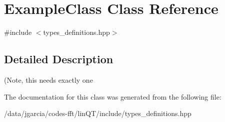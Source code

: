 \hypertarget{classExampleClass}{}\section{Example\+Class Class Reference}
\label{classExampleClass}


{\ttfamily \#include $<$types\+\_\+definitions.\+hpp$>$}



\subsection{Detailed Description}
(Note, this needs exactly one 

The documentation for this class was generated from the following file\+:\begin{DoxyCompactItemize}
\item 
/data/jgarcia/codes-\/fft/lin\+Q\+T/include/types\+\_\+definitions.\+hpp\end{DoxyCompactItemize}
